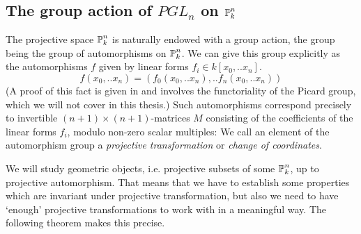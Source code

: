 \subsection{The group action of $PGL_n$ on $\operatorname{\mathbb P}^n_k$}

The projective space $\operatorname{\mathbb P}^n_k$ is naturally endowed with a group action, the group being the group of automorphisms on $\operatorname{\mathbb P}^n_k$.
We can give this group explicitly as the automorphisms $f$ given by linear forms $f_i \in k[x_0,..x_n]$.
\begin{equation}
f(x_0,..x_n) = (f_0(x_0,..x_n),..f_n(x_0,..x_n))
\end{equation}
(A proof of this fact is given in \cite[example 7.1.1]{hartshorne1977algebraic} and involves the functoriality of the Picard group, which we will not cover in this thesis.)
Such automorphisms correspond precisely to invertible $(n+1)\times(n+1)$-matrices $M$ consisting of the coefficients of the linear forms $f_i$, modulo non-zero scalar multiples:
We call an element of the automorphism group a \emph{projective transformation} or \emph{change of coordinates}.

We will study geometric objects, i.e. projective subsets of some $\operatorname{\mathbb P}^n_k$, up to projective automorphism.
That means that we have to establish some properties which are invariant under projective transformation, but also we need to have `enough' projective transformations to work with in a meaningful way.
The following theorem makes this precise.


